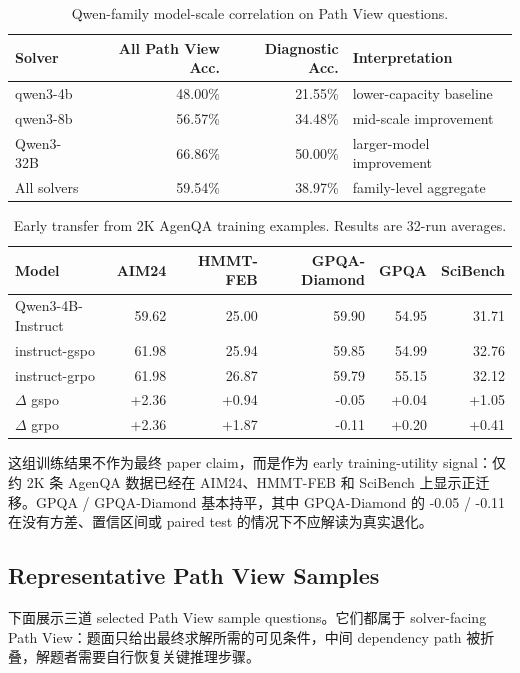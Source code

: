 \documentclass[11pt]{ctexart}
\begin{document}
\begin{table}[H]
\centering
\small
\caption{Qwen-family model-scale correlation on Path View questions.}
\label{tab:qwen}
\begin{tabular}{lrrl}
\toprule
Solver & All Path View Acc. & Diagnostic Acc. & Interpretation \\
\midrule
qwen3-4b & 48.00\% & 21.55\% & lower-capacity baseline \\
qwen3-8b & 56.57\% & 34.48\% & mid-scale improvement \\
Qwen3-32B & 66.86\% & 50.00\% & larger-model improvement \\
\midrule
All solvers & 59.54\% & 38.97\% & family-level aggregate \\
\bottomrule
\end{tabular}
\end{table}

\begin{table}[H]
\centering
\scriptsize
\caption{Early transfer from 2K AgenQA training examples. Results are 32-run averages.}
\label{tab:training-transfer}
\begin{tabular}{lrrrrr}
\toprule
Model & AIM24 & HMMT-FEB & GPQA-Diamond & GPQA & SciBench \\
\midrule
Qwen3-4B-Instruct & 59.62 & 25.00 & 59.90 & 54.95 & 31.71 \\
instruct-gspo & 61.98 & 25.94 & 59.85 & 54.99 & 32.76 \\
instruct-grpo & 61.98 & 26.87 & 59.79 & 55.15 & 32.12 \\
\midrule
$\Delta$ gspo & +2.36 & +0.94 & -0.05 & +0.04 & +1.05 \\
$\Delta$ grpo & +2.36 & +1.87 & -0.11 & +0.20 & +0.41 \\
\bottomrule
\end{tabular}
\end{table}

这组训练结果不作为最终 paper claim，而是作为 early training-utility signal：仅约 2K 条 AgenQA 数据已经在 AIM24、HMMT-FEB 和 SciBench 上显示正迁移。GPQA / GPQA-Diamond 基本持平，其中 GPQA-Diamond 的 -0.05 / -0.11 在没有方差、置信区间或 paired test 的情况下不应解读为真实退化。

\subsection{Representative Path View Samples}

下面展示三道 selected Path View sample questions。它们都属于 solver-facing Path View：题面只给出最终求解所需的可见条件，中间 dependency path 被折叠，解题者需要自行恢复关键推理步骤。
\end{document}
